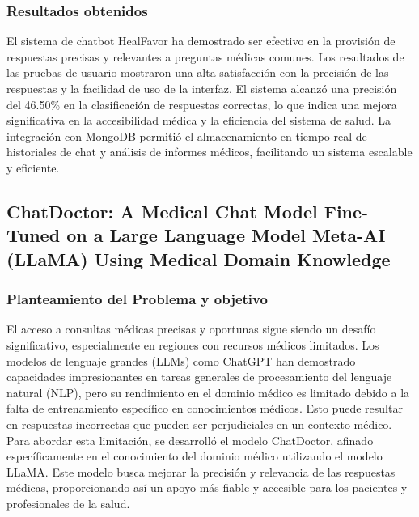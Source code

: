 \subsubsection{Resultados obtenidos}
	El sistema de chatbot HealFavor ha demostrado ser efectivo en la provisión de respuestas precisas y relevantes a preguntas médicas comunes. Los resultados de las pruebas de usuario mostraron una alta satisfacción con la precisión de las respuestas y la facilidad de uso de la interfaz. El sistema alcanzó una precisión del 46.50\% en la clasificación de respuestas correctas, lo que indica una mejora significativa en la accesibilidad médica y la eficiencia del sistema de salud. La integración con MongoDB permitió el almacenamiento en tiempo real de historiales de chat y análisis de informes médicos, facilitando un sistema escalable y eficiente.


\subsection{ChatDoctor: A Medical Chat Model Fine-Tuned on a Large Language Model Meta-AI (LLaMA) Using Medical Domain Knowledge} %
\subsubsection{Planteamiento del Problema y objetivo}
	El acceso a consultas médicas precisas y oportunas sigue siendo un desafío significativo, especialmente en regiones con recursos médicos limitados. Los modelos de lenguaje grandes (LLMs) como ChatGPT han demostrado capacidades impresionantes en tareas generales de procesamiento del lenguaje natural (NLP), pero su rendimiento en el dominio médico es limitado debido a la falta de entrenamiento específico en conocimientos médicos. Esto puede resultar en respuestas incorrectas que pueden ser perjudiciales en un contexto médico. Para abordar esta limitación, se desarrolló el modelo ChatDoctor, afinado específicamente en el conocimiento del dominio médico utilizando el modelo LLaMA. Este modelo busca mejorar la precisión y relevancia de las respuestas médicas, proporcionando así un apoyo más fiable y accesible para los pacientes y profesionales de la salud.

